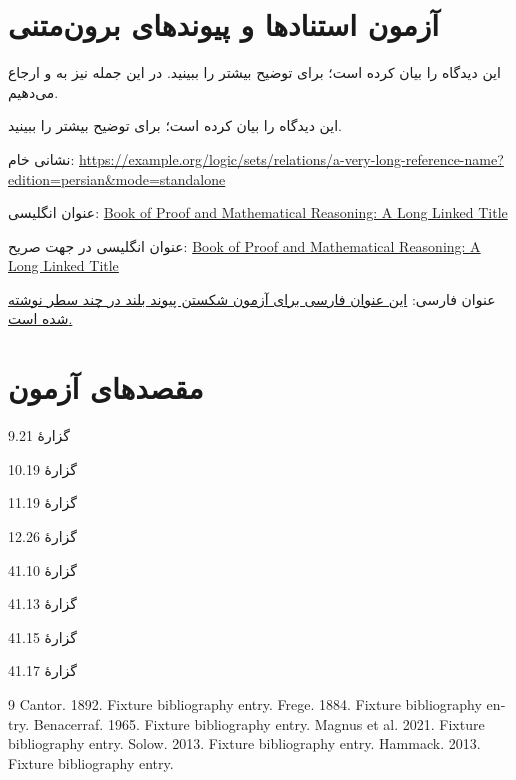 \documentclass[14pt,oneside,openany]{memoir}
\begin{document}
\chapter*{آزمون استنادها و پیوندهای برون‌متنی}
\noindent\begin{minipage}{468pt}\raggedleft
این دیدگاه را \citet{Cantor1892} بیان کرده است؛ برای توضیح بیشتر
\citep{Frege1884,Benacerraf1965,Magnus2021} را ببینید.
در این جمله نیز به \citet{Solow2013} و \citet{Hammack2013} ارجاع می‌دهیم.
\end{minipage}\par\medskip
\noindent\begin{minipage}{190pt}\raggedleft
این دیدگاه را \citet{Cantor1892} بیان کرده است؛ برای توضیح بیشتر
\citep{Frege1884,Benacerraf1965,Magnus2021} را ببینید.
\end{minipage}\par\bigskip
\noindent\begin{minipage}{260pt}\raggedleft
نشانی خام:
\url{https://example.org/logic/sets/relations/a-very-long-reference-name?edition=persian&mode=standalone}
\par عنوان انگلیسی:
\href{https://example.org/book-of-proof}{Book of Proof and Mathematical Reasoning: A Long Linked Title}
\par عنوان انگلیسی در جهت صریح:
\foreignlanguage{english}{\href{https://example.org/explicit-ltr-title}{Book of Proof and Mathematical Reasoning: A Long Linked Title}}
\par عنوان فارسی:
\href{https://example.org/persian-title}{این عنوان فارسی برای آزمون شکستن پیوند بلند در چند سطر نوشته شده است.}
\end{minipage}
\newpage
\endgroup
\chapter*{مقصدهای آزمون}
\hypertarget{fixture.n9.21}{گزارهٔ 9.21}\par
\hypertarget{fixture.n10.19}{گزارهٔ 10.19}\par
\hypertarget{fixture.n11.19}{گزارهٔ 11.19}\par
\hypertarget{fixture.n12.26}{گزارهٔ 12.26}\par
\hypertarget{fixture.n41.10}{گزارهٔ 41.10}\par
\hypertarget{fixture.n41.13}{گزارهٔ 41.13}\par
\hypertarget{fixture.n41.15}{گزارهٔ 41.15}\par
\hypertarget{fixture.n41.17}{گزارهٔ 41.17}\par
\begin{otherlanguage}{english}
\begin{thebibliography}{9}
 Cantor. 1892. Fixture bibliography entry.
 Frege. 1884. Fixture bibliography entry.
 Benacerraf. 1965. Fixture bibliography entry.
 Magnus et al. 2021. Fixture bibliography entry.
 Solow. 2013. Fixture bibliography entry.
 Hammack. 2013. Fixture bibliography entry.
\end{thebibliography}
\end{otherlanguage}
\end{document}
